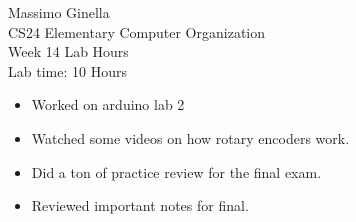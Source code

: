 \documentclass[12pt]{article}
\begin{document}
	\begin{center}
		Massimo Ginella \\
		CS24 Elementary Computer Organization \\
		Week 14 Lab Hours \\
		Lab time: 10 Hours \vspace{0.5cm} \\
	\end{center}
	
	\begin{itemize}
		\item Worked on arduino lab 2
		\item Watched some videos on how rotary encoders work.
		\item Did a ton of practice review for the final exam.
		\item Reviewed important notes for final.
	\end{itemize}
	
	
	
\end{document}

